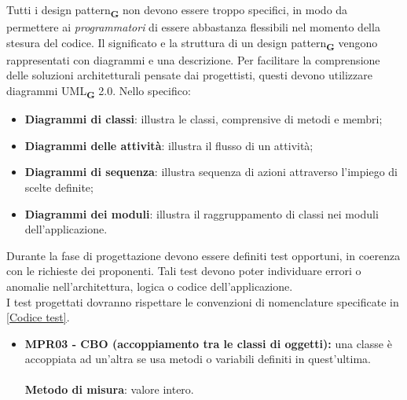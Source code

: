 Tutti i design pattern\textsubscript{\textbf{G}} non devono essere troppo specifici, in modo da permettere ai \textit{programmatori} di essere abbastanza flessibili nel momento della stesura del codice.
Il significato e la struttura di un design pattern\textsubscript{\textbf{G}} vengono rappresentati con diagrammi e una descrizione.
Per facilitare la comprensione delle soluzioni architetturali pensate dai progettisti, questi devono utilizzare diagrammi UML\textsubscript{\textbf{G}} 2.0.
Nello specifico:
\begin{itemize}
    \item \textbf{Diagrammi di classi}: illustra le classi, comprensive di metodi e membri;
    \item \textbf{Diagrammi delle attività}: illustra il flusso di un attività;
    \item \textbf{Diagrammi di sequenza}: illustra sequenza di azioni attraverso l'impiego di scelte definite;
    \item \textbf{Diagrammi dei moduli}: illustra il raggruppamento di classi nei moduli dell'applicazione.
\end{itemize}
Durante la fase di progettazione devono essere definiti test opportuni, in coerenza con le richieste dei proponenti.
Tali test devono poter individuare errori o anomalie nell'architettura, logica o codice dell'applicazione.\\
I test progettati dovranno rispettare le convenzioni di nomenclature specificate in \ref{Codice test}.
\begin{itemize}
    \item \textbf{MPR03 - CBO (accoppiamento tra le classi di oggetti):} una classe è accoppiata ad un'altra se usa metodi o variabili definiti in quest'ultima.\\
          \\\textbf{Metodo di misura}: valore intero.
\end{itemize}
